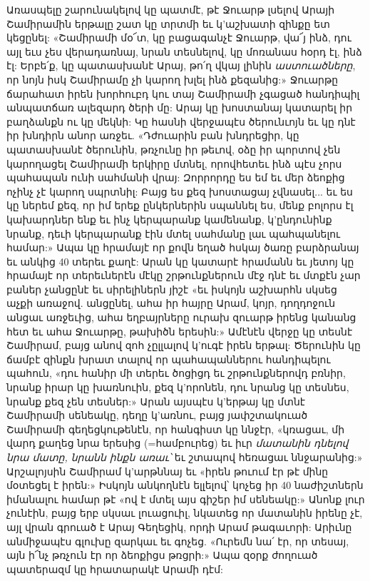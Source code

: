 \documentclass{article}
\begin{document}
{Առասպելը շարունակելով կը պատմէ, թէ Ջուարթ լսելով Արայի Շամիրամին երթալը շատ կը տրտմի եւ կ'աշխատի զինքը ետ կեցընել: «Շամիրամի մօ՜տ, կը բացագանչէ Ջուարթ, վա՜յ ինձ, դու այլ եւս չես վերադառնայ, նրան տեսնելով, կը մոռանաս հօրդ էլ, ինձ էլ: Երբե՛ք, կը պատասխանէ Արայ, թո՛ղ վկայ լինին \emph{աստուածները}, որ նոյն իսկ Շամիրամը չի կարող խլել ինձ քեզանից:» Ջուարթը ճարահատ իրեն խորհուբդ կու տայ Շամիրամի չգացած հանդիպիլ անպատճառ ալեզարդ ծերի մը: Արայ կը խոստանայ կատարել իր բաղձանքն ու կը մեկնի: Կը հասնի վերջապէս ծերունւոյն եւ կը դնէ իր խնդիրն անոր առջեւ. «Դժուարին բան խնդրեցիր, կը պատասխանէ ծերունին, թռչունը իր թեւով, օձը իր պորտով չեն կարողացել Շամիրամի երկիրը մտնել, որովհետեւ ինձ պէս չորս պահապան ունի սահմանի վրայ: Զորրորդը ես եմ եւ մեր ձեոքից ոչինչ չէ կարող սպրտնիլ: Բայց ես քեզ խոստացայ չվնասել... եւ ես կը ներեմ քեզ, որ իմ երեք ընկերներին սպաննել ես, մենք բոլորս էլ կախարդներ ենք եւ ինչ կերպարանք կամենանք, կ'ընդունինք նրանք, դեւի կերպարանք էին մտել սահմանը լաւ պահպանելու համար:» Ապա կը հրամայէ որ քովն եղած հսկայ ծառը բարձրանայ եւ անկից 40 տերեւ քաղէ: Արան կը կատարէ հրամանն եւ յետոյ կը հրամայէ որ տերեւներէն մէկը շրթունքներուն մէջ դնէ եւ մտքէն չար բաներ չանցընէ եւ սիրելիներն յիշէ «եւ իսկոյն աշխարհն սկսեց աչքի առաջով. անցընել, ահա իր հայրը Արամ, կոյր, դողդոջուն անցաւ առջեւից, ահա եղբայրները ուրախ զուարթ իրենց կանանց հետ եւ ահա Ջուարթը, թախիծն երեսին:» Ամէնէն վերջը կը տեսնէ Շամիրամ, բայց անով զոհ չըլլալով կ'ուգէ իրեն երթալ: Ծերունին կը ճամբէ զինքն խրատ տալով որ պահապաններու հանդիպելու պահուն, «դու հանիր մի տերեւ ծոցիցդ եւ շրթունքներովդ բռնիր, նրանք իրար կը խառնուին, քեզ կ'որոնեն, դու նրանց կը տեսնես, նրանք քեզ չեն տեսներ:» Արան այսպէս կ'երթայ կը մտնէ Շամիրամի սենեակը, դեղը կ'առնու, բայց յափշտակուած Շամիրամի գեղեցկութենէն, որ հանգիստ կը ննջէր, «կռացաւ, մի վարդ քաղեց նրա երեսից (=համբուրեց) եւ իւր \emph{մատանին դնելով նրա մատը, նրանն ինքն առաւ՝} եւ շտապով հեռացաւ ննջարանից:» Արշալոյսին Շամիրամ կ'արթննայ եւ «իրեն թուում էր թէ մինը մօտեցել է իրեն:» Իսկոյն անկողնէն ելլելով՝ կոչեց իր 40 նաժիշտներն իմանալու համար թէ «ով է մտել այս գիշեր իմ սենեակը:» Անոնք լուր չունէին, բայց երբ սկսաւ լուացուիլ, նկատեց որ մատանին իրենը չէ, այլ վրան գրուած է Արայ Գեղեցիկ, որդի Արամ թագաւորի: Արիւնը անմիջապէս գլուխը զարկաւ եւ գոչեց. «Ուրեմն նա՛ էր, որ տեսայ, այն ի՜նչ թռչուն էր որ ձեոքիցս թռցրի:» Ապա զօրք ժողուած պատերազմ կը հրատարակէ Արամի դէմ:

}
\end{document}
